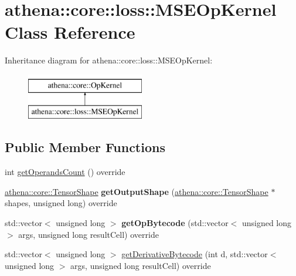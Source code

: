 \hypertarget{classathena_1_1core_1_1loss_1_1_m_s_e_op_kernel}{}\section{athena\+:\+:core\+:\+:loss\+:\+:M\+S\+E\+Op\+Kernel Class Reference}
\label{classathena_1_1core_1_1loss_1_1_m_s_e_op_kernel}
Inheritance diagram for athena\+:\+:core\+:\+:loss\+:\+:M\+S\+E\+Op\+Kernel\+:\begin{figure}[H]
\begin{center}
\leavevmode
\includegraphics[height=2.000000cm]{classathena_1_1core_1_1loss_1_1_m_s_e_op_kernel}
\end{center}
\end{figure}
\subsection*{Public Member Functions}
\begin{DoxyCompactItemize}
\item 
int \mbox{\hyperlink{classathena_1_1core_1_1loss_1_1_m_s_e_op_kernel_ab851ee62ea95c3aab8aab2d28cfa9d04}{get\+Operands\+Count}} () override
\item 
\mbox{\label{classathena_1_1core_1_1loss_1_1_m_s_e_op_kernel_a6da143ede778fbe34cab3137aeb97196}} 
\mbox{\hyperlink{classathena_1_1core_1_1_tensor_shape}{athena\+::core\+::\+Tensor\+Shape}} {\bfseries get\+Output\+Shape} (\mbox{\hyperlink{classathena_1_1core_1_1_tensor_shape}{athena\+::core\+::\+Tensor\+Shape}} $\ast$shapes, unsigned long) override
\item 
\mbox{\label{classathena_1_1core_1_1loss_1_1_m_s_e_op_kernel_a86e6436fad7cad62c235dcde0f3991ce}} 
std\+::vector$<$ unsigned long $>$ {\bfseries get\+Op\+Bytecode} (std\+::vector$<$ unsigned long $>$ args, unsigned long result\+Cell) override
\item 
std\+::vector$<$ unsigned long $>$ \mbox{\hyperlink{classathena_1_1core_1_1loss_1_1_m_s_e_op_kernel_a2d1fc6b2900abc3ebd0466c8de3e68e2}{get\+Derivative\+Bytecode}} (int d, std\+::vector$<$ unsigned long $>$ args, unsigned long result\+Cell) override
\end{DoxyCompactItemize}
